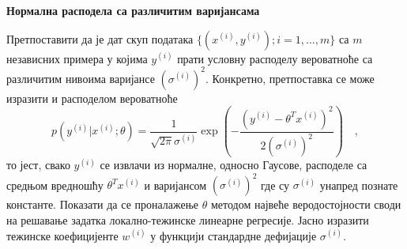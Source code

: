 \item{} {\bf Нормална расподела са различитим варијансама}

Претпоставити да је дат скуп података $\{(x^{(i)},y^{(i)});i=1,\ldots,m\}$ са $m$ независних примера у којима $y^{(i)}$ прати условну расподелу вероватноће са различитим нивоима варијансе $(\sigma^{(i)})^2$. Конкретно, претпоставка се може изразити и расподелом вероватноће
\begin{equation*}
 p(y^{(i)}|x^{(i)};\theta)=\dfrac{1}{\sqrt{2\pi}\sigma^{(i)}}\exp\left(-\dfrac{\left(y^{(i)}-\theta^Tx^{(i)}\right)^2}{2\left(\sigma^{(i)}\right)^2}\right)\quad,
\end{equation*}
то јест, свако $y^{(i)}$ се извлачи из нормалне, односно Гаусове, расподеле са средњом вредношћу $\theta^Tx^{(i)}$ и варијансом $(\sigma^{(i)})^2$ где су $\sigma^{(i)}$ унапред познате константе. Показати да се проналажење $\theta$ методом највеће веродостојности своди на решавање задатка локално-тежинске линеарне регресије. Јасно изразити тежинске коефицијенте $w^{(i)}$ у функцији стандардне дефијације $\sigma^{(i)}$.

